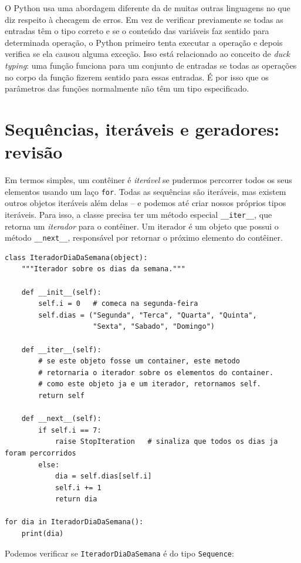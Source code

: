 \documentclass[11pt,a4paper]{article}
\begin{document}
O Python usa uma abordagem diferente da de muitas outras linguagens no
que diz respeito à checagem de erros. Em vez de verificar previamente se
todas as entradas têm o tipo correto e se o conteúdo das variáveis faz
sentido para determinada operação, o Python primeiro tenta executar a
operação e depois verifica se ela causou alguma exceção. Isso está
relacionado ao conceito de \emph{duck typing}: uma função funciona para
um conjunto de entradas se todas as operações no corpo da função fizerem
sentido para essas entradas. É por isso que os parâmetros das funções
normalmente não têm um tipo especificado.

\section{Sequências, iteráveis e geradores: revisão}

Em termos simples, um contêiner é \emph{iterável} se pudermos percorrer
todos os seus elementos usando um laço \texttt{for}. Todas as sequências
são iteráveis, mas existem outros objetos iteráveis além delas -- e
podemos até criar nossos próprios tipos iteráveis. Para isso, a classe
precisa ter um método especial \texttt{\_\_iter\_\_}, que retorna um
\emph{iterador} para o contêiner. Um iterador é um objeto que possui o
método \texttt{\_\_next\_\_}, responsável por retornar o próximo elemento
do contêiner.

\begin{lstlisting}
class IteradorDiaDaSemana(object):
    """Iterador sobre os dias da semana."""

    def __init__(self):
        self.i = 0   # comeca na segunda-feira
        self.dias = ("Segunda", "Terca", "Quarta", "Quinta",
                     "Sexta", "Sabado", "Domingo")

    def __iter__(self):
        # se este objeto fosse um container, este metodo
        # retornaria o iterador sobre os elementos do container.
        # como este objeto ja e um iterador, retornamos self.
        return self

    def __next__(self):
        if self.i == 7:
            raise StopIteration   # sinaliza que todos os dias ja foram percorridos
        else:
            dia = self.dias[self.i]
            self.i += 1
            return dia

for dia in IteradorDiaDaSemana():
    print(dia)
\end{lstlisting}

Podemos verificar se \texttt{IteradorDiaDaSemana} é do tipo
\texttt{Sequence}:
\end{document}

